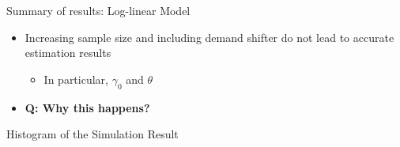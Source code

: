 \documentclass[aspectratio = 169]{beamer}
\theoremstyle{definition}
\begin{document}
\begin{frame}{Summary of results: Log-linear Model}
    \begin{itemize}
        \item Increasing sample size and including demand shifter do not lead to accurate estimation results
        \begin{itemize}
            \item In particular, $\gamma_0$ and $\theta$
        \end{itemize}
        \item \textbf{Q: Why this happens?}
    \end{itemize}
\end{frame}

\begin{frame}{Histogram of the Simulation Result}
    \begin{figure}[!htbp]
      \begin{center}
            \hfill
          \label{fg:histogram_loglinear_loglinear_no_constraint} 
        \end{center}
    \end{figure}
\end{frame}
\end{document}
